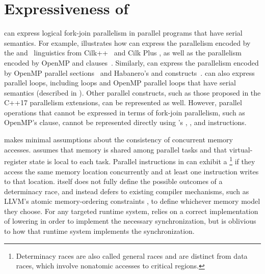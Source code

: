 

\section{Expressiveness of \tapir}

\tapir can express logical fork-join parallelism in parallel programs
that have serial semantics.  For example,  illustrates how
\tapir can express the parallelism encoded by the \CilkSpawn and
\CilkSync\ linguistics from Cilk++\ \cite{Leiserson10} and Cilk Plus
\cite{IntelCilkPlus10}, as well as the parallelism encoded by OpenMP
 and  clauses~\cite{AyguadeCoDu09}.
Similarly, \tapir can express the parallelism encoded by OpenMP
parallel sections~\cite{OpenMP13} and Habanero's  and
 constructs~\cite{CaveZhSh11}.  \tapir can also express
parallel loops, including \CilkFor loops and OpenMP parallel loops
that have serial semantics (described in ).  Other
parallel constructs, such as those proposed in the C++17 parallelism extensions,
can be represented as well. However, parallel
operations that cannot be expressed in terms of fork-join parallelism,
such as OpenMP's  clause, cannot be represented directly
using \tapir's \detach, \reattach, and \sync instructions.

\tapir makes minimal assumptions about the consistency \cite{Pugh99,
  BoehmAd08} of concurrent memory accesses.  \tapir assumes that
memory is shared among parallel tasks and that virtual-register state
is local to each task.  Parallel instructions in \tapir can exhibit a
\footnote{Determinacy races are also called
  general races \cite{NetzerMi92} and are distinct from data races,
  which involve nonatomic accesses to critical regions.}
\cite{FengLe99} if they access the same memory location concurrently
and at least one instruction writes to that location.  \tapir itself
does not fully define the possible outcomes of a determinacy race, and
instead defers to existing compiler mechanisms, such as LLVM's atomic
memory-ordering constraints \cite{LLVMLangManual15}, to define
whichever memory model they choose.  For any targeted runtime system,
\tapir relies on a correct implementation of lowering in order to
implement the necessary synchronization, but \tapir is oblivious to
how that runtime system implements the synchronization.

